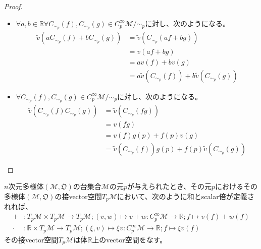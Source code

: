 \documentclass[dvipdfmx]{jsarticle}
\begin{document}
\begin{proof}
  \begin{itemize}
    \item $\forall a,b\in \mathbb{R} \forall C_{\sim_p}\left(f\right),C_{\sim_p}\left(g\right)\in C^\infty_p \mathcal{M}/\sim_p $に対し、次のようになる。
    \begin{align*}
      \widetilde{v}\left( aC_{\sim_p}\left(f\right)+bC_{\sim_p}\left(g\right)\right) &=\widetilde{v}\left( C_{\sim_p}\left(af+bg\right)\right) \\
      &=v\left(af+bg\right) \\
      &=av\left(f\right)+bv\left(g\right)\\
      &=a\widetilde{v}\left(C_{\sim_p}\left(f\right)\right) +b\widetilde{v}\left(C_{\sim_p}\left(g\right)\right) 
    \end{align*}
    \item $\forall C_{\sim_p} \left(f\right),C_{\sim_p} \left(g\right)\in C^\infty_p \mathcal{M}/\sim_p $に対し、次のようになる。
    \begin{align*}
      \widetilde{v}\left( C_{\sim_p}\left(f\right)C_{\sim_p}\left(g\right)\right) &= \widetilde{v}\left( C_{\sim_p}\left(fg\right)\right) \\
      &=v\left(fg\right) \\
      &=v\left(f\right) g\left( p\right) +f\left( p\right) v\left(g\right) \\
      &=\widetilde{v}\left(C_{\sim_p}\left(f\right)\right) g\left( p\right) +f\left( p\right) \widetilde{v}\left(C_{\sim_p}\left(g\right)\right) 
    \end{align*}
  \end{itemize}
\end{proof}
\begin{thm}\label{8.3.3.7}
  $n$次元多様体$\left(\mathcal{M},\mathfrak{O}\right)$の台集合$\mathcal{M}$の元$p$が与えられたとき、その元$p$におけるその多様体$\left( \mathcal{M},\mathfrak{O} \right) $の接vector空間$T_p \mathcal{M}$において、次のように和とscalar倍が定義されれば、
  \begin{align*}
    +&:T_p \mathcal{M} \times T_p \mathcal{M} \rightarrow T_p \mathcal{M} ; \left( v,w\right) \mapsto v+w:C^\infty_p \mathcal{M} \rightarrow \mathbb{R} ; f\mapsto v\left(f\right) +w\left(f\right) \\
    \cdot &: \mathbb{R} \times T_p \mathcal{M} \rightarrow T_p \mathcal{M} ; \left( \xi,v\right) \mapsto \xi v:C^\infty_p \mathcal{M} \rightarrow \mathbb{R} ; f\mapsto \xi v\left(f\right) 
  \end{align*}
  その接vector空間$T_p \mathcal{M}$は体$\mathbb{R}$上のvector空間をなす。
\end{thm}
\end{document}
